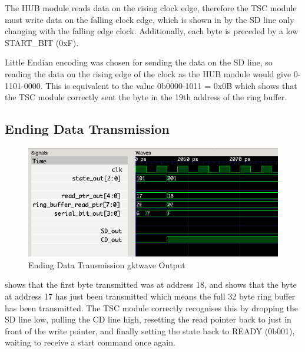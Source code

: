 The HUB module reads data on the rising clock edge, therefore the TSC module must write data on the falling clock edge, which is shown in  by the SD line only changing with the falling edge clock.
Additionally, each byte is preceded by a low START\_BIT (0xF).

Little Endian encoding was chosen for sending the data on the SD line, so reading the data on the rising edge of the clock as the HUB module would give 0-1101-0000.
This is equivalent to the value 0b0000-1011 = 0x0B which shows that the TSC module correctly sent the byte in the 19th address of the ring buffer.

\subsection{Ending Data Transmission}
\begin{figure}[H]
    \centering
    \includegraphics[width=\columnwidth]{Figures/Jtransmit_end}
    \caption{Ending Data Transmission gktwave Output}
    \label{fig:testJ}
\end{figure}

 shows that the first byte transmitted was at address 18, and  shows that the byte at address 17 has just been transmitted which means the full 32 byte ring buffer has been transmitted.
The TSC module correctly recognises this by dropping the SD line low, pulling the CD line high, resetting the read pointer back to just in front of the write pointer, and finally setting the state back to READY (0b001), waiting to receive a start command once again.